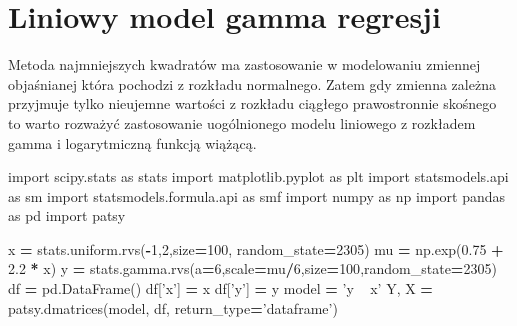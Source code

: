 \documentclass[polish,]{book}
\newenvironment{Shaded}{\begin{snugshade}}{\end{snugshade}}
\newcommand{\DecValTok}[1]{\textcolor[rgb]{0.00,0.00,0.81}{#1}}
\newcommand{\FloatTok}[1]{\textcolor[rgb]{0.00,0.00,0.81}{#1}}
\newcommand{\ImportTok}[1]{#1}
\newcommand{\NormalTok}[1]{#1}
\newcommand{\OperatorTok}[1]{\textcolor[rgb]{0.81,0.36,0.00}{\textbf{#1}}}
\newcommand{\StringTok}[1]{\textcolor[rgb]{0.31,0.60,0.02}{#1}}
\begin{document}
\hypertarget{R32}{%
\section{Liniowy model gamma regresji}\label{R32}}

Metoda najmniejszych kwadratów ma zastosowanie w modelowaniu zmiennej objaśnianej która pochodzi z rozkładu normalnego. Zatem gdy zmienna zależna przyjmuje tylko nieujemne wartości z rozkładu ciągłego prawostronnie skośnego to warto rozważyć zastosowanie uogólnionego modelu liniowego z rozkładem gamma i logarytmiczną funkcją wiążącą.

\begin{Shaded}
\begin{Highlighting}[]
\ImportTok{import}\NormalTok{ scipy.stats }\ImportTok{as}\NormalTok{ stats}
\ImportTok{import}\NormalTok{ matplotlib.pyplot }\ImportTok{as}\NormalTok{ plt}
\ImportTok{import}\NormalTok{ statsmodels.api }\ImportTok{as}\NormalTok{ sm}
\ImportTok{import}\NormalTok{ statsmodels.formula.api }\ImportTok{as}\NormalTok{ smf}
\ImportTok{import}\NormalTok{ numpy }\ImportTok{as}\NormalTok{ np}
\ImportTok{import}\NormalTok{ pandas }\ImportTok{as}\NormalTok{ pd}
\ImportTok{import}\NormalTok{ patsy}

\NormalTok{x }\OperatorTok{=}\NormalTok{ stats.uniform.rvs(}\OperatorTok{-}\DecValTok{1}\NormalTok{,}\DecValTok{2}\NormalTok{,size}\OperatorTok{=}\DecValTok{100}\NormalTok{, random_state}\OperatorTok{=}\DecValTok{2305}\NormalTok{)}
\NormalTok{mu }\OperatorTok{=}\NormalTok{ np.exp(}\FloatTok{0.75} \OperatorTok{+} \FloatTok{2.2} \OperatorTok{*}\NormalTok{ x)}
\NormalTok{y }\OperatorTok{=}\NormalTok{ stats.gamma.rvs(a}\OperatorTok{=}\DecValTok{6}\NormalTok{,scale}\OperatorTok{=}\NormalTok{mu}\OperatorTok{/}\DecValTok{6}\NormalTok{,size}\OperatorTok{=}\DecValTok{100}\NormalTok{,random_state}\OperatorTok{=}\DecValTok{2305}\NormalTok{)}
\NormalTok{df }\OperatorTok{=}\NormalTok{ pd.DataFrame()}
\NormalTok{df[}\StringTok{'x'}\NormalTok{] }\OperatorTok{=}\NormalTok{ x}
\NormalTok{df[}\StringTok{'y'}\NormalTok{] }\OperatorTok{=}\NormalTok{ y}
\NormalTok{model }\OperatorTok{=} \StringTok{'y ~ x'}
\NormalTok{Y, X }\OperatorTok{=}\NormalTok{ patsy.dmatrices(model, df, return_type}\OperatorTok{=}\StringTok{'dataframe'}\NormalTok{)}
  

\end{Highlighting}
\end{Shaded}
\end{document}
